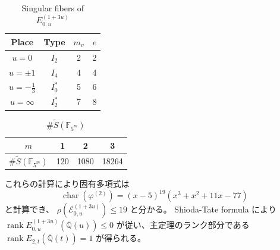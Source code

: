 \documentclass{classes/mybeamer}
\DeclareMathOperator{\rank}{rank}
\DeclareMathOperator{\chara}{char}
\begin{document}
\begin{frame}
    \begin{table}[ht]
        \centering
        \caption{Singular fibers of $E_{0,u}^{(1 + 3u)}$}
        \begin{tabular}{|c|c|c|c|}
            \hline
            Place            & Type    & $m_v$ & $e$ \\
            \hline
            $u=0$            & $I_2$   & 2     & 2   \\
            $u=\pm 1$        & $I_4$   & 4     & 4   \\
            $u=-\frac{1}{3}$ & $I_0^*$ & 5     & 6   \\
            $u=\infty$       & $I_2^*$ & 7     & 8   \\
            \hline
        \end{tabular}
        \label{tab:E_{0,u}^{(1 + 3u)}}
    \end{table}

    \begin{table}[ht]
        \centering
        \caption{$\# \tilde{S}(\mathbb{F}_{5^{m}})$}
        \begin{tabular}{|c|c|c|c|}
            \hline
            $m$                              & 1   & 2    & 3     \\
            \hline
            $\# \tilde{S}(\mathbb{F}_{5^m})$ & 120 & 1080 & 18264 \\
            \hline
        \end{tabular}
        \label{tab:tm}
    \end{table}
    これらの計算により固有多項式は
    \begin{equation*}
        \chara(\varphi^{(2)}) = (x - 5)^{19}(x^{3} + x^{2} + 11 x - 77)
    \end{equation*}
    と計算でき、 $\rho(\mathcal{E}_{0,u}^{(1 + 3u)}) \leq 19$ と分かる。
    Shioda-Tate formula により $\rank E_{0,u}^{(1 + 3u)}(\overline{\mathbb{Q}}(u)) \leq 0$ が従い、主定理のランク部分である $\rank E_{2,t}(\overline{\mathbb{Q}}(t)) = 1$ が得られる。
\end{frame}
\end{document}
